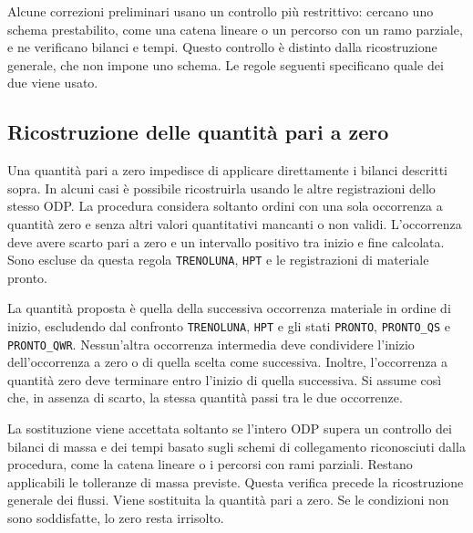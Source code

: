 Alcune correzioni preliminari usano un controllo più restrittivo: cercano uno schema prestabilito, come una catena lineare o un percorso con un ramo parziale, e ne verificano bilanci e tempi. Questo controllo è distinto dalla ricostruzione generale, che non impone uno schema. Le regole seguenti specificano quale dei due viene usato.

\subsection{Ricostruzione delle quantità pari a zero}
\label{sec:zero-material-quantities}

Una quantità pari a zero impedisce di applicare direttamente i bilanci descritti sopra. In alcuni casi è possibile ricostruirla usando le altre registrazioni dello stesso ODP. La procedura considera soltanto ordini con una sola occorrenza a quantità zero e senza altri valori quantitativi mancanti o non validi. L'occorrenza deve avere scarto pari a zero e un intervallo positivo tra inizio e fine calcolata. Sono escluse da questa regola \texttt{TRENOLUNA}, \texttt{HPT} e le registrazioni di materiale pronto.

La quantità proposta è quella della successiva occorrenza materiale in ordine di inizio, escludendo dal confronto \texttt{TRENOLUNA}, \texttt{HPT} e gli stati \texttt{PRONTO}, \texttt{PRONTO\_QS} e \texttt{PRONTO\_QWR}. Nessun'altra occorrenza intermedia deve condividere l'inizio dell'occorrenza a zero o di quella scelta come successiva. Inoltre, l'occorrenza a quantità zero deve terminare entro l'inizio di quella successiva. Si assume così che, in assenza di scarto, la stessa quantità passi tra le due occorrenze.

La sostituzione viene accettata soltanto se l'intero ODP supera un controllo dei bilanci di massa e dei tempi basato sugli schemi di collegamento riconosciuti dalla procedura, come la catena lineare o i percorsi con rami parziali. Restano applicabili le tolleranze di massa previste. Questa verifica precede la ricostruzione generale dei flussi. Viene sostituita la quantità pari a zero. Se le condizioni non sono soddisfatte, lo zero resta irrisolto.

